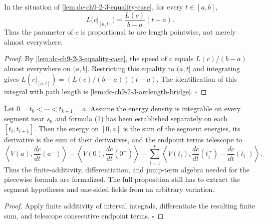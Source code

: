 \begin{lemma}
  \label{lem:dc-ch9-2-3-pointwise-arclength}


  In the situation of \cref{lem:dc-ch9-2-3-equality-case}, for every $t\in[a,b]$,
  $$
  L\big(c|_{[a,t]}\big)=\frac{L(c)}{b-a}(t-a).
  $$
  Thus the parameter of $c$ is proportional to arc length pointwise, not merely almost
  everywhere.
\end{lemma}
\begin{proof}

  By \cref{lem:dc-ch9-2-3-equality-case}, the speed of $c$ equals
  $L(c)/(b-a)$ almost everywhere on $(a,b]$. Restricting this equality to $(a,t]$ and
  integrating gives
  $L(c|_{[a,t]})=(L(c)/(b-a))(t-a)$. The identification of this integral with path length
  is \cref{lem:dc-ch9-2-3-arclength-bridge}. $\square$
\end{proof}

\begin{lemma}
  \label{lem:dc-ch9-2-4-piecewise-assembly}


  Let $0=t_0<\cdots<t_{k+1}=a$. Assume the energy density is integrable on every
  segment near $s_0$ and formula (1) has been established separately on each
  $[t_i,t_{i+1}]$. Then the energy on $[0,a]$ is the sum of the segment energies, its
  derivative is the sum of their derivatives, and the endpoint terms telescope to
  $$
  \left\langle V(a),\frac{dc}{dt}(a^-)\right\rangle
  -\left\langle V(0),\frac{dc}{dt}(0^+)\right\rangle
  -\sum_{i=1}^k\left\langle V(t_i),
    \frac{dc}{dt}(t_i^+)-\frac{dc}{dt}(t_i^-)\right\rangle.
  $$
  Thus the finite-additivity, differentiation, and jump-term algebra needed for the
  piecewise formula are formalized. The full proposition still has to extract the
  segment hypotheses and one-sided fields from an arbitrary variation.
\end{lemma}
\begin{proof}

  Apply finite additivity of interval integrals, differentiate the resulting finite sum,
  and telescope consecutive endpoint terms. $\square$
\end{proof}

